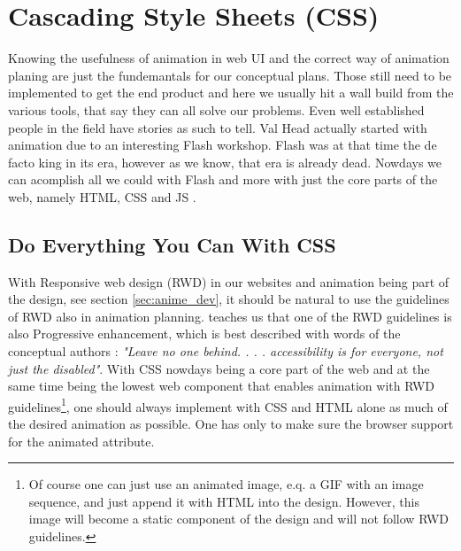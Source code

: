 %
%
% 
% 
% 


\chapter{Cascading Style Sheets (CSS)}

\label{chap:CSS}

Knowing the usefulness of animation in web UI and the correct way of animation 
planing are just the fundemantals for our conceptual plans. Those still need to 
be implemented to get the end product and here we usually hit a wall build from 
the various tools, that say they can all solve our problems. Even well 
established people in the field have stories as such to tell. Val Head actually 
started with animation due to an interesting Flash workshop. Flash was at that 
time the de facto king in its era, however as we know, that era is already 
dead. Nowdays we can acomplish
all we could with Flash and more with just the core parts of the web, namely 
HTML, CSS and JS
\citep{head2016designing}.

\section{Do Everything You Can With CSS}

\label{sec:everythingCSS}

With Responsive web design (RWD) in our websites and animation being part of 
the design, see section \ref{sec:anime_dev}, it should be natural to use the 
guidelines of RWD also in animation planning. \citet{IAWEB} teaches us that one 
of the RWD guidelines is also Progressive enhancement, which is best described 
with words of the conceptual authors \citet{champeon2003inclusive}: {\em"Leave 
no one behind. . . .  accessibility is for everyone, not just the disabled"}. 
With CSS nowdays being a core part of the web and at the same time being the 
lowest web component that enables animation with RWD guidelines\footnote{Of 
course one can just use an animated image, e.q. a GIF with an image sequence, 
and just append it with HTML into the design. However, this image will become a 
static component of the design and will not follow RWD guidelines.}, one should 
always implement with CSS and HTML alone as much of the desired animation as 
possible. One has only to make sure the browser support for the animated 
attribute.

